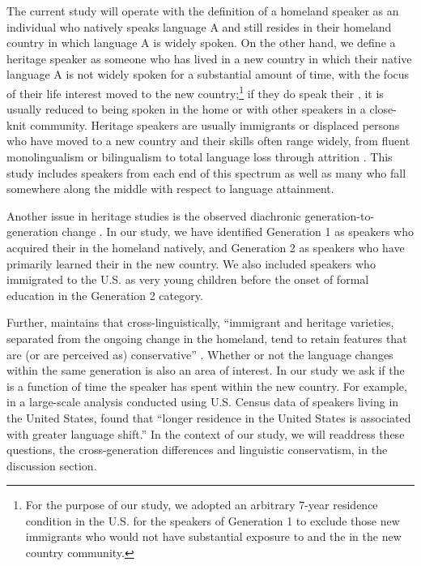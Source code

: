\documentclass[output=paper,modfonts,newtxmath,hidelinks,]{langscibook}
\begin{document}
The current study will operate with the definition of a homeland speaker as an individual who natively speaks language A and still resides in their homeland country in which language A is widely spoken. On the other hand, we define a heritage speaker as someone who has lived in a new country in which their native language A is not widely spoken for a substantial amount of time, with the focus of their life interest moved to the new country;\footnote{For the purpose of our study, we adopted an arbitrary 7-year residence condition in the U.S. for the speakers of Generation 1 to exclude those new immigrants who would not have substantial exposure to  and the  in the new country community.} if they do speak their , it is usually reduced to being spoken in the home or with other speakers in a close-knit community. Heritage speakers are usually immigrants or displaced persons who have moved to a new country and their  skills often range widely, from fluent monolingualism or bilingualism to total language loss through attrition \citep{Scontras-etal2015}. This study includes speakers from each end of this spectrum as well as many who fall somewhere along the middle with respect to language attainment.



Another issue in heritage studies is the observed diachronic generation-to-generation change \citep{Otheguy-etal2007}. In our study, we have identified Generation 1 as speakers who acquired their  in the homeland natively, and Generation 2 as speakers who have primarily learned their  in the new country. We also included speakers who immigrated to the U.S. as very young children before the onset of formal education in the Generation 2 category.



Further, \citet{Polinsky2018} maintains that cross-linguistically, “immigrant and heritage varieties, separated from the ongoing change in the homeland, tend to retain features that are (or are perceived as) conservative” \citep[129]{Polinsky2018}. Whether or not the language changes within the same generation is also an area of interest. In our study we ask if the  is a function of time the speaker has spent within the new country. For example, in a large-scale analysis conducted using U.S. Census data of  speakers living in the United States, \citet{Veltman2000} found that “longer residence in the United States is associated with greater language shift.” \citep[66]{Veltman2000} In the context of our study, we will readdress these questions, the cross-generation differences and linguistic conservatism, in the discussion section.
\end{document}

